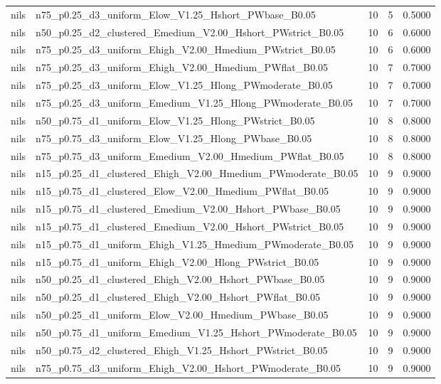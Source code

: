 \begin{tabular}{llrrr}
nils & n75_p0.25_d3_uniform_Elow_V1.25_Hshort_PWbase_B0.05 & 10 & 5 & 0.5000 \\
nils & n50_p0.25_d2_clustered_Emedium_V2.00_Hshort_PWstrict_B0.05 & 10 & 6 & 0.6000 \\
nils & n75_p0.25_d3_uniform_Ehigh_V2.00_Hmedium_PWstrict_B0.05 & 10 & 6 & 0.6000 \\
nils & n75_p0.25_d3_uniform_Ehigh_V2.00_Hmedium_PWflat_B0.05 & 10 & 7 & 0.7000 \\
nils & n75_p0.25_d3_uniform_Elow_V1.25_Hlong_PWmoderate_B0.05 & 10 & 7 & 0.7000 \\
nils & n75_p0.25_d3_uniform_Emedium_V1.25_Hlong_PWmoderate_B0.05 & 10 & 7 & 0.7000 \\
nils & n50_p0.75_d1_uniform_Elow_V1.25_Hlong_PWstrict_B0.05 & 10 & 8 & 0.8000 \\
nils & n75_p0.75_d3_uniform_Elow_V1.25_Hlong_PWbase_B0.05 & 10 & 8 & 0.8000 \\
nils & n75_p0.75_d3_uniform_Emedium_V2.00_Hmedium_PWflat_B0.05 & 10 & 8 & 0.8000 \\
nils & n15_p0.25_d1_clustered_Ehigh_V2.00_Hmedium_PWmoderate_B0.05 & 10 & 9 & 0.9000 \\
nils & n15_p0.75_d1_clustered_Elow_V2.00_Hmedium_PWflat_B0.05 & 10 & 9 & 0.9000 \\
nils & n15_p0.75_d1_clustered_Emedium_V2.00_Hshort_PWbase_B0.05 & 10 & 9 & 0.9000 \\
nils & n15_p0.75_d1_clustered_Emedium_V2.00_Hshort_PWstrict_B0.05 & 10 & 9 & 0.9000 \\
nils & n15_p0.75_d1_uniform_Ehigh_V1.25_Hmedium_PWmoderate_B0.05 & 10 & 9 & 0.9000 \\
nils & n15_p0.75_d1_uniform_Ehigh_V2.00_Hlong_PWstrict_B0.05 & 10 & 9 & 0.9000 \\
nils & n50_p0.25_d1_clustered_Ehigh_V2.00_Hshort_PWbase_B0.05 & 10 & 9 & 0.9000 \\
nils & n50_p0.25_d1_clustered_Ehigh_V2.00_Hshort_PWflat_B0.05 & 10 & 9 & 0.9000 \\
nils & n50_p0.25_d1_uniform_Elow_V2.00_Hmedium_PWbase_B0.05 & 10 & 9 & 0.9000 \\
nils & n50_p0.75_d1_uniform_Emedium_V1.25_Hshort_PWmoderate_B0.05 & 10 & 9 & 0.9000 \\
nils & n50_p0.75_d2_clustered_Ehigh_V1.25_Hshort_PWstrict_B0.05 & 10 & 9 & 0.9000 \\
nils & n75_p0.75_d3_uniform_Ehigh_V2.00_Hshort_PWmoderate_B0.05 & 10 & 9 & 0.9000 \\

\end{tabular}

